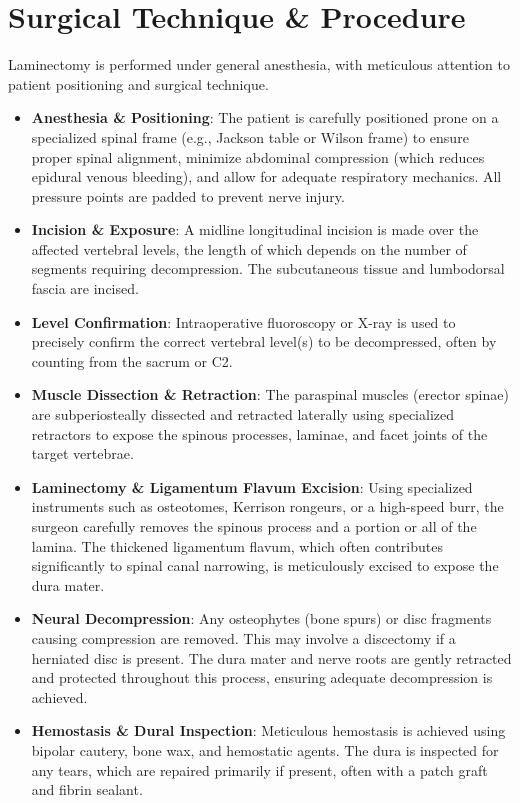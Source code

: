 \section*{Surgical Technique \& Procedure}
Laminectomy is performed under general anesthesia, with meticulous attention to patient positioning and surgical technique.

\begin{itemize}
  \item \textbf{Anesthesia \& Positioning}: The patient is carefully positioned prone on a specialized spinal frame (e.g., Jackson table or Wilson frame) to ensure proper spinal alignment, minimize abdominal compression (which reduces epidural venous bleeding), and allow for adequate respiratory mechanics. All pressure points are padded to prevent nerve injury.
  \item \textbf{Incision \& Exposure}: A midline longitudinal incision is made over the affected vertebral levels, the length of which depends on the number of segments requiring decompression. The subcutaneous tissue and lumbodorsal fascia are incised.
  \item \textbf{Level Confirmation}: Intraoperative fluoroscopy or X-ray is used to precisely confirm the correct vertebral level(s) to be decompressed, often by counting from the sacrum or C2.
  \item \textbf{Muscle Dissection \& Retraction}: The paraspinal muscles (erector spinae) are subperiosteally dissected and retracted laterally using specialized retractors to expose the spinous processes, laminae, and facet joints of the target vertebrae.
  \item \textbf{Laminectomy \& Ligamentum Flavum Excision}: Using specialized instruments such as osteotomes, Kerrison rongeurs, or a high-speed burr, the surgeon carefully removes the spinous process and a portion or all of the lamina. The thickened ligamentum flavum, which often contributes significantly to spinal canal narrowing, is meticulously excised to expose the dura mater.
  \item \textbf{Neural Decompression}: Any osteophytes (bone spurs) or disc fragments causing compression are removed. This may involve a discectomy if a herniated disc is present. The dura mater and nerve roots are gently retracted and protected throughout this process, ensuring adequate decompression is achieved.
  \item \textbf{Hemostasis \& Dural Inspection}: Meticulous hemostasis is achieved using bipolar cautery, bone wax, and hemostatic agents. The dura is inspected for any tears, which are repaired primarily if present, often with a patch graft and fibrin sealant.

\end{itemize}
